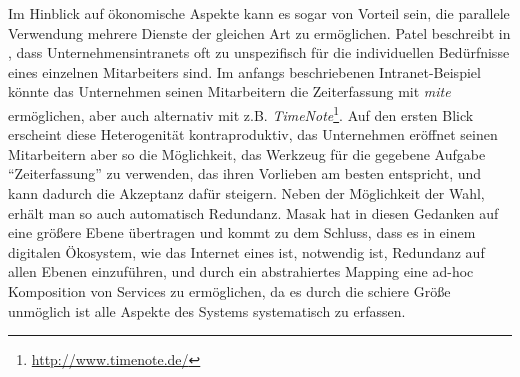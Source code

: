 Im Hinblick auf ökonomische Aspekte kann es sogar von Vorteil sein, die parallele Verwendung mehrere Dienste der gleichen Art zu ermöglichen. Patel beschreibt in \cite[S.29]{pl-depintra}, dass Unternehmensintranets oft zu unspezifisch für die individuellen Bedürfnisse eines einzelnen Mitarbeiters sind. Im anfangs beschriebenen Intranet-Beispiel könnte das Unternehmen seinen Mitarbeitern die Zeiterfassung mit \emph{mite} ermöglichen, aber auch alternativ mit z.B. \emph{TimeNote}\footnote{\url{http://www.timenote.de/}}. Auf den ersten Blick erscheint diese Heterogenität kontraproduktiv, das Unternehmen eröffnet seinen Mitarbeitern aber so die Möglichkeit, das Werkzeug für die gegebene Aufgabe "`Zeiterfassung"' zu verwenden, das ihren  Vorlieben am besten entspricht, und kann dadurch die Akzeptanz dafür steigern. Neben der Möglichkeit der Wahl, erhält man so auch automatisch Redundanz. Masak hat in \cite[S.236ff]{mkdigioe} diesen Gedanken auf eine größere Ebene übertragen und kommt zu dem Schluss, dass es in einem digitalen Ökosystem, wie das Internet eines ist, notwendig ist, Redundanz auf allen Ebenen einzuführen, und durch ein abstrahiertes Mapping eine ad-hoc Komposition von Services zu ermöglichen, da es durch die schiere Größe unmöglich ist alle Aspekte des Systems systematisch zu erfassen.
